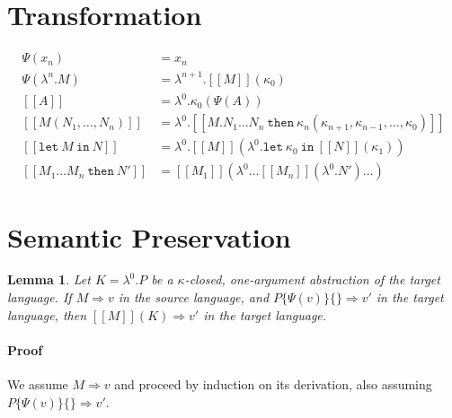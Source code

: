 \documentclass[a4paper,11pt]{article}
\newtheorem{lemma}{Lemma}
\begin{document}
\section{Transformation}\label{sec:transformation}

\begin{align*}
\Psi(x_{n}) &=
  x_{n} \\
\Psi(\lambda^{n}.M) &=
  \lambda^{n+1}.[\![M]\!](\kappa_{0}) \\[1em]
[\![A]\!] &=
  \lambda^{0}.\kappa_{0} (\Psi(A)) \\
[\![M(N_{1}, \ldots, N_{n})]\!] &=
  \lambda^{0}.[\![M . N_{1} \ldots N_{n} \: \texttt{then} \:
  \kappa_{n}(\kappa_{n+1}, \kappa_{n-1}, \ldots, \kappa_{0})]\!] \\
[\![\texttt{let} \: M \: \texttt{in} \: N]\!] &=
  \lambda^{0}.[\![M]\!] (\lambda^{0}.\texttt{let} \:
  \kappa_{0} \: \texttt{in} \: [\![N]\!] (\kappa_{1})) \\
[\![M_{1} \ldots M_{n} \: \texttt{then} \: N']\!] &=
  [\![M_{1}]\!] (\lambda^{0} \ldots [\![M_{n}]\!] (\lambda^{0}.N') \ldots )
\end{align*}


\section{Semantic Preservation}\label{sec:semanticpreservation}

\begin{lemma}
  Let $K = \lambda^{0}.P$ be a $\kappa$-closed, one-argument
  abstraction of the target language. If $M \Rightarrow v$ in the
  source language, and $P\{\Psi(v)\}\{\} \Rightarrow v'$ in the target
  language, then $[\![M]\!](K) \Rightarrow v'$ in the target language.
\end{lemma}

\paragraph{Proof}

We assume $M \Rightarrow v$ and proceed by induction on its derivation, also
assuming $P\{\Psi(v)\}\{\} \Rightarrow v'$.

\end{document}
